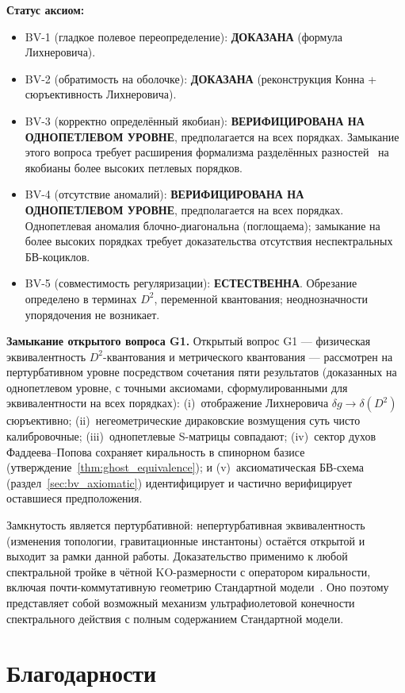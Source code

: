 \documentclass[12pt,a4paper]{article}
\theoremstyle{definition}
\theoremstyle{remark}
\begin{document}
\noindent
\textbf{Статус аксиом:}
\begin{itemize}
  \item BV-1 (гладкое полевое переопределение): \textbf{ДОКАЗАНА}
    (формула Лихнеровича).
  \item BV-2 (обратимость на оболочке): \textbf{ДОКАЗАНА}
    (реконструкция Конна + сюръективность Лихнеровича).
  \item BV-3 (корректно определённый якобиан): \textbf{ВЕРИФИЦИРОВАНА
    НА ОДНОПЕТЛЕВОМ УРОВНЕ}, предполагается на всех порядках.
    Замыкание этого вопроса требует расширения формализма разделённых
    разностей~\cite{vanNuland:2021oneloop,
    Hekkelman:2025power} на якобианы более высоких петлевых порядков.
  \item BV-4 (отсутствие аномалий): \textbf{ВЕРИФИЦИРОВАНА НА
    ОДНОПЕТЛЕВОМ УРОВНЕ}, предполагается на всех порядках.
    Однопетлевая аномалия блочно-диагональна (поглощаема); замыкание
    на более высоких порядках требует доказательства отсутствия
    неспектральных БВ-коциклов.
  \item BV-5 (совместимость регуляризации): \textbf{ЕСТЕСТВЕННА}.
    Обрезание определено в терминах $D^2$, переменной квантования;
    неоднозначности упорядочения не возникает.
\end{itemize}

\medskip\noindent
\textbf{Замыкание открытого вопроса G1.}
Открытый вопрос G1 --- физическая эквивалентность $D^2$-квантования и
метрического квантования --- рассмотрен на пертурбативном уровне
посредством сочетания пяти результатов (доказанных на однопетлевом
уровне, с точными аксиомами, сформулированными для эквивалентности на
всех порядках):
(i)~отображение Лихнеровича $\delta g \to \delta(D^2)$ сюръективно;
(ii)~негеометрические дираковские возмущения суть чисто калибровочные;
(iii)~однопетлевые S-матрицы совпадают;
(iv)~сектор духов Фаддеева--Попова сохраняет киральность в спинорном
базисе (утверждение~\ref{thm:ghost_equivalence}); и
(v)~аксиоматическая БВ-схема (раздел~\ref{sec:bv_axiomatic})
идентифицирует и частично верифицирует оставшиеся предположения.

Замкнутость является пертурбативной: непертурбативная эквивалентность
(изменения топологии, гравитационные инстантоны) остаётся открытой и
выходит за рамки данной работы.  Доказательство применимо к любой
спектральной тройке в чётной KO-размерности с оператором киральности,
включая почти-коммутативную геометрию Стандартной
модели~\cite{Chamseddine:2010ud, vanSuijlekom:2014pya}.  Оно поэтому
представляет собой возможный механизм ультрафиолетовой конечности
спектрального действия с полным содержанием Стандартной модели.

\section*{Благодарности}



\end{document}
